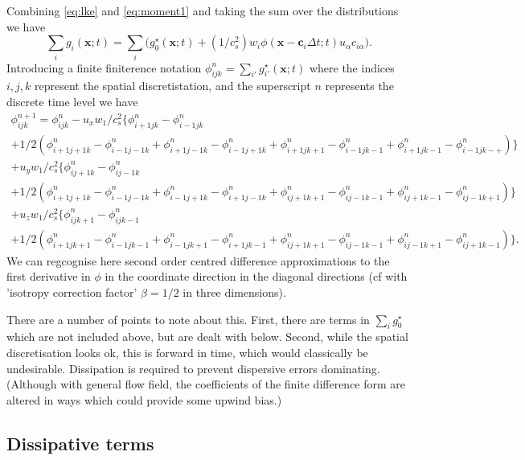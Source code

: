 Combining \ref{eq:lke} and \ref{eq:moment1} and taking the sum over
the distributions we have
\begin{equation}
\sum_i g_i (\mathbf{x};t) = \sum_i \Big( g_0^\star (\mathbf{x};t)  +
(1/c_s^2)  w_i \phi (\mathbf{x} - \mathbf{c}_i \Delta t;t)
u_\alpha c_{i\alpha} \Big).
\end{equation}
Introducing a finite finiterence notation $\phi_{ijk}^n
= \sum_{i'} g_{i'}^\star (\mathbf{x}; t)$ where the indices $i,j,k$
represent the spatial discretistation, and the superscript $n$ represents
the discrete time level we have
\begin{eqnarray}
\phi_{ijk}^{n+1}  = \phi_{ijk}^n - u_x w_1/c_s^2 \Big\{
\phi_{i+1 j k}^n - \phi_{i-1 j k}^n \\
+ 1/2(
\phi_{i+1 j+1 k}^n - \phi_{i-1 j-1 k}^n +
\phi_{i+1 j-1 k}^n - \phi_{i-1 j+1 k}^n +
\phi_{i+1 j k+1}^n - \phi_{i-1 j k-1}^n +
\phi_{i+1 j k-1}^n - \phi_{i-1 j k-+}^n)
\Big\} \\ +
u_y w_1 / c_s^2 \Big\{
\phi_{i j+1 k}^n - \phi_{i j-1 k}^n \\
+ 1/2 (
\phi_{i+1 j+1 k}^n - \phi_{i-1 j-1 k}^n +
\phi_{i-1 j+1 k}^n - \phi_{i+1 j-1 k}^n +
\phi_{i j+1 k+1}^n - \phi_{i j-1 k-1}^n +
\phi_{i j+1 k-1}^n - \phi_{i j-1 k+1}^n)
\Big\} \\ +
u_z w_1 / c_s^2 \Big\{
\phi_{i j k+1}^n - \phi_{i j k-1}^n \\
+ 1/2 (
\phi_{i+1 j k+1}^n - \phi_{i-1 j k-1}^n +
\phi_{i-1 j k+1}^n - \phi_{i+1 j k-1}^n +
\phi_{i j+1 k+1}^n - \phi_{i j-1 k-1}^n +
\phi_{i j-1 k+1}^n - \phi_{i j+1 k-1}^n) \Big\}.
\end{eqnarray}
We can regcognise here second order centred difference approximations to
the first derivative in $\phi$ in the coordinate direction in the
diagonal directions (cf \cite{sescu2008} with 'isotropy correction factor'
$\beta = 1/2$ in three dimensions).

There are a number of points to note about this. First, there are
terms in $\sum_i g_0^\star$ which are not included above, but are dealt
with below. Second, while the spatial discretisation looks ok, this is
forward in time, which would classically be undesirable. Dissipation
is required to prevent dispersive errors dominating. (Although with
general flow field, the coefficients of the finite difference form are
altered in ways which could provide some upwind bias.)

\subsection{Dissipative terms} 


